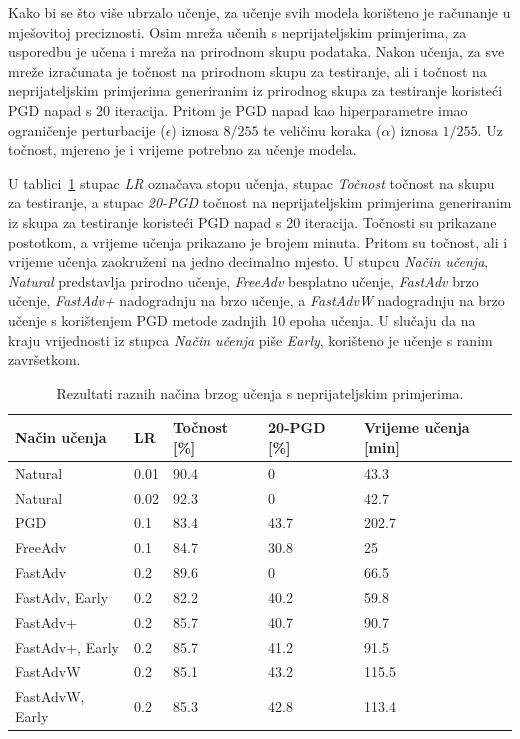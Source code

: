 \documentclass[times, utf8, zavrsni, numeric]{fer}
\begin{document}
Kako bi se što više ubrzalo učenje, za učenje svih modela korišteno je računanje u mješovitoj preciznosti.
Osim mreža učenih s neprijateljskim primjerima, za usporedbu je učena i mreža na prirodnom skupu podataka. Nakon učenja, za sve mreže izračunata je točnost na prirodnom skupu za testiranje,
ali i točnost na neprijateljskim primjerima generiranim iz prirodnog skupa za testiranje koristeći PGD napad s 20 iteracija. 
Pritom je PGD napad kao hiperparametre imao ograničenje perturbacije ($\epsilon$) iznosa $8/255$ te veličinu koraka ($\alpha$) iznosa $1/255$.
Uz točnost, mjereno je i vrijeme potrebno za učenje modela.

U tablici~\ref{tbl:mjerenja_robusno_ucenje} stupac \textit{LR} označava stopu učenja, stupac \textit{Točnost} točnost na skupu za testiranje, a stupac \textit{20-PGD} točnost na neprijateljskim primjerima generiranim iz skupa za testiranje koristeći PGD napad s 20 iteracija.
Točnosti su prikazane postotkom, a vrijeme učenja prikazano je brojem minuta. Pritom su točnost, ali i vrijeme učenja zaokruženi na jedno decimalno mjesto.
U stupcu \textit{Način učenja}, \textit{Natural} predstavlja prirodno učenje, \textit{FreeAdv} besplatno učenje, \textit{FastAdv} brzo učenje, 
\textit{FastAdv+} nadogradnju na brzo učenje, a \textit{FastAdvW} nadogradnju na brzo učenje s korištenjem PGD metode zadnjih 10 epoha učenja.
U slučaju da na kraju vrijednosti iz stupca \textit{Način učenja} piše \textit{Early}, korišteno je učenje s ranim završetkom.

\pagebreak

\begin{table}[htb]
    \caption{Rezultati raznih načina brzog učenja s neprijateljskim primjerima.}
    \label{tbl:mjerenja_robusno_ucenje}
    \centering
    \begin{tabular}{lllll} \hline
    Način učenja & LR & Točnost [\%] & 20-PGD [\%] & Vrijeme učenja [min]\\ \hline
    Natural & 0.01 & 90.4 & 0 & 43.3 \\
    Natural & 0.02 & 92.3 & 0 & 42.7 \\
    PGD & 0.1 & 83.4 & 43.7 & 202.7 \\
    FreeAdv & 0.1 & 84.7 & 30.8 & 25 \\
    FastAdv & 0.2 & 89.6 & 0 & 66.5 \\
    FastAdv, Early & 0.2 & 82.2 & 40.2 & 59.8 \\
    FastAdv+ & 0.2 & 85.7 & 40.7 & 90.7 \\
    FastAdv+, Early & 0.2 & 85.7 & 41.2 & 91.5 \\
    FastAdvW & 0.2 & 85.1 & 43.2 & 115.5 \\
    FastAdvW, Early & 0.2 & 85.3 & 42.8 & 113.4 \\ \hline
    \end{tabular}
\end{table}    
\end{document}
